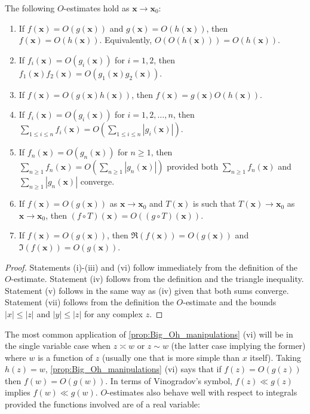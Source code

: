       \begin{proposition}\label{prop:Big_Oh_manipulations}
          The following $O$-estimates hold as $\mathbf{x} \to \mathbf{x}_{0}$:
          \begin{enumerate}[label=(\roman*)]
            \item If $f(\mathbf{x}) = O(g(\mathbf{x}))$ and $g(\mathbf{x}) = O(h(\mathbf{x}))$, then $f(\mathbf{x}) = O(h(\mathbf{x}))$. Equivalently, $O(O(h(\mathbf{x}))) = O(h(\mathbf{x}))$.
            \item If $f_{i}(\mathbf{x}) = O(g_{i}(\mathbf{x}))$ for $i = 1,2$, then $f_{1}(\mathbf{x})f_{2}(\mathbf{x}) = O(g_{1}(\mathbf{x})g_{2}(\mathbf{x}))$.
            \item If $f(\mathbf{x}) = O(g(\mathbf{x})h(\mathbf{x}))$, then $f(\mathbf{x}) = g(\mathbf{x})O(h(\mathbf{x}))$.
            \item If $f_{i}(\mathbf{x}) = O(g_{i}(\mathbf{x}))$ for $i = 1,2,\ldots,n$, then $\sum_{1 \le i \le n}f_{i}(\mathbf{x}) = O\left(\sum_{1 \le i \le n}|g_{i}(\mathbf{x})|\right)$.
            \item If $f_{n}(\mathbf{x}) = O(g_{n}(\mathbf{x}))$ for $n \ge 1$, then $\sum_{n \ge 1}f_{n}(\mathbf{x}) = O\left(\sum_{n \ge 1}|g_{n}(\mathbf{x})|\right)$ provided both $\sum_{n \ge 1}f_{n}(\mathbf{x})$ and $\sum_{n \ge 1}|g_{n}(\mathbf{x})|$ converge.
            \item If $f(\mathbf{x}) = O(g(\mathbf{x}))$ as $\mathbf{x} \to \mathbf{x}_{0}$ and $T(\mathbf{x})$ is such that $T(\mathbf{x}) \to \mathbf{x}_{0}$ as $\mathbf{x} \to \mathbf{x}_{0}$, then $(f \circ T)(\mathbf{x}) = O((g \circ T)(\mathbf{x}))$.
            \item If $f(\mathbf{x}) = O(g(\mathbf{x}))$, then $\Re(f(\mathbf{x})) = O(g(\mathbf{x}))$ and $\Im(f(\mathbf{x})) = O(g(\mathbf{x}))$.
          \end{enumerate}
      \end{proposition}
      \begin{proof}
        Statements (i)-(iii) and (vi) follow immediately from the definition of the $O$-estimate. Statement (iv) follows from the definition and the triangle inequality. Statement (v) follows in the same way as (iv) given that both sums converge. Statement (vii) follows from the definition the $O$-estimate and the bounds $|x| \le |z|$ and $|y| \le |z|$ for any complex $z$.
      \end{proof}

      The most common application of \cref{prop:Big_Oh_manipulations} (vi) will be in the single variable case when $z \asymp w$ or $z \sim w$ (the latter case implying the former) where $w$ is a function of $z$ (usually one that is more simple than $x$ itself). Taking $h(z) = w$, \cref{prop:Big_Oh_manipulations} (vi) says that if $f(z) = O(g(z))$ then $f(w) = O(g(w))$. In terms of Vinogradov's symbol, $f(z) \ll g(z)$ implies $f(w) \ll g(w)$. $O$-estimates also behave well with respect to integrals provided the functions involved are of a real variable:

